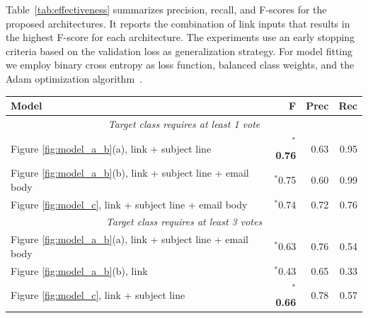 \documentclass{sigchi}
\begin{document}
Table~\ref{tab:effectiveness} summarizes precision, recall, and F-scores for the proposed architectures. It reports the combination of link inputs that results in the highest F-score for each architecture. The experiments use an early stopping criteria based on the validation loss as generalization strategy. For model fitting we employ binary cross entropy as loss function, balanced class weights, and the Adam optimization algorithm~\cite{kingma_2014}.

\begin{table}[bt]
	\small
	\centering
	\begin{tabular}{l r r r}
		{\centering\textbf{Model}}   &  \textbf{F}  & \textbf{Prec} &  \textbf{Rec}\\
		\midrule
		\multicolumn{4}{c}{\textit{Target class requires at least 1 vote}}\\
    	\midrule
		Figure \ref{fig:model_a_b}(a), link + subject line & $^*$\textbf{0.76} & 0.63 & 0.95\\ %
   		Figure \ref{fig:model_a_b}(b), link + subject line + email body & $^*$0.75  & 0.60  & 0.99\\%
		Figure \ref{fig:model_c}, link + subject line + email body & $^*$0.74 & 0.72 & 0.76\\%
		\midrule			                                        
		\multicolumn{4}{c}{\textit{Target class requires at least 3 votes}}\\
		\midrule		
		Figure \ref{fig:model_a_b}(a), link + subject line + email body & $^*$0.63 & 0.76 & 0.54\\ %
        Figure \ref{fig:model_a_b}(b), link & $^*$0.43 & 0.65  & 0.33\\%
		Figure \ref{fig:model_c}, link + subject line & $^*$\textbf{0.66} & 0.78  & 0.57\\

\end{tabular}
\end{table}
\end{document}

